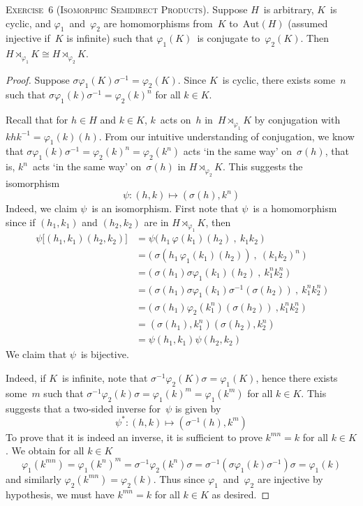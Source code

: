 \documentclass[letterpaper]{article}
\newcommand{\exercise}[1]{\goodbreak\noindent\textsc{Exercise~{#1}.}}
\newcommand{\iso}{\cong}
\newcommand{\aut}{\mathrm{Aut}}
\begin{document}
\exercise{6 (Isomorphic Semidirect Products)}
Suppose $H$~is arbitrary, $K$~is cyclic, and $\varphi_1$~and~$\varphi_2$ are homomorphisms from~$K$ to~$\aut(H)$ (assumed injective if~$K$ is infinite) such that $\varphi_1(K)$~is conjugate to~$\varphi_2(K)$. Then $H\rtimes_{\varphi_1}K\iso H\rtimes_{\varphi_2}K$.
\begin{proof}
Suppose $\sigma\varphi_1(K)\sigma^{-1}=\varphi_2(K)$. Since $K$~is cyclic, there exists some~$n$ such that $\sigma\varphi_1(k)\sigma^{-1}=\varphi_2(k)^n$ for all $k\in K$.

Recall that for $h\in H$ and $k\in K$, $k$~acts on~$h$ in~$H\rtimes_{\varphi_1}K$ by conjugation with $khk^{-1}=\varphi_1(k)(h)$. From our intuitive understanding of conjugation, we know that $\sigma\varphi_1(k)\sigma^{-1}=\varphi_2(k)^n=\varphi_2(k^n)$ acts `in the same way' on~$\sigma(h)$, that is, $k^n$~acts `in the same way' on~$\sigma(h)$ in $H\rtimes_{\varphi_2}K$. This suggests the isomorphism
$$\psi:(h,k)\mapsto(\sigma(h),k^n)$$
Indeed, we claim $\psi$~is an isomorphism. First note that $\psi$~is a homomorphism since if $(h_1,k_1)$ and $(h_2,k_2)$ are in $H\rtimes_{\varphi_1}K$, then
\begin{align*}
\psi\bigl[(h_1,k_1)(h_2,k_2)\bigr]&=\psi\bigl(\ h_1\,\varphi(k_1)(h_2)\ ,\ k_1k_2\ \bigr)\\
	&=\bigl(\ \sigma(h_1\,\varphi_1(k_1)(h_2))\ ,\ (k_1k_2)^n\ \bigr)\\
	&=\bigl(\ \sigma(h_1)\sigma\varphi_1(k_1)(h_2)\ ,\ k_1^nk_2^n\ \bigr)\\
	&=\bigl(\ \sigma(h_1)\sigma\varphi_1(k_1)\sigma^{-1}(\sigma(h_2))\ ,\ k_1^n k_2^n\ \bigr)\\
	&=\bigl(\ \sigma(h_1)\varphi_2(k_1^n)(\sigma(h_2))\ ,k_1^nk_2^n\ \bigr)\\
	&=(\sigma(h_1),k_1^n)(\sigma(h_2),k_2^n)\\
	&=\psi(h_1,k_1)\psi(h_2,k_2)
\end{align*}
We claim that $\psi$~is bijective.

Indeed, if $K$~is infinite, note that $\sigma^{-1}\varphi_2(K)\sigma=\varphi_1(K)$, hence there exists some~$m$ such that $\sigma^{-1}\varphi_2(k)\sigma=\varphi_1(k)^m=\varphi_1(k^m)$ for all $k\in K$. This suggests that a two-sided inverse for~$\psi$ is given by
$$\psi^*:(h,k)\mapsto(\sigma^{-1}(h),k^m)$$
To prove that it is indeed an inverse, it is sufficient to prove $k^{mn}=k$ for all $k\in K$. We obtain for all $k\in K$
$$\varphi_1(k^{mn})=\varphi_1(k^n)^m=\sigma^{-1}\varphi_2(k^n)\sigma=\sigma^{-1}(\sigma\varphi_1(k)\sigma^{-1})\sigma=\varphi_1(k)$$
and similarly $\varphi_2(k^{mn})=\varphi_2(k)$. Thus since $\varphi_1$~and~$\varphi_2$ are injective by hypothesis, we must have $k^{mn}=k$ for all $k\in K$ as desired.


\end{proof}
\end{document}
